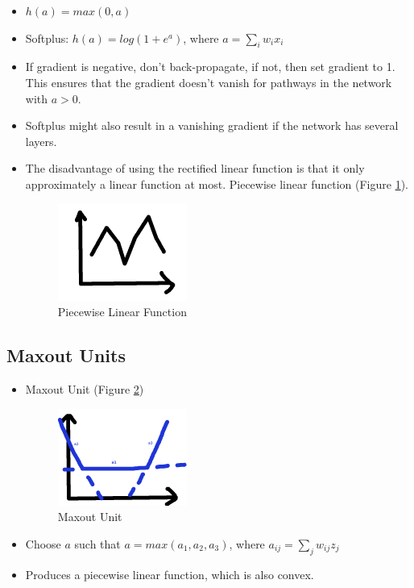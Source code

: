 \documentclass[parskip=half]{scrartcl}
\begin{document}
    \begin{itemize}
        \item 
        $h(a) = max(0, a) $
        \item 
        Softplus: $h(a) = log(1 + e^a) $, where $a = \sum_i w_i x_i $
        \item 
        If gradient is negative, don't back-propagate, if not, then set gradient to 1. This ensures that the gradient doesn't vanish for pathways in the network with $a > 0$.
        \item 
        Softplus might also result in a vanishing gradient if the network has several layers.
        \item 
        The disadvantage of using the rectified linear function is that it only approximately a linear function at most. Piecewise linear function (Figure \ref{fig:piecewise-linear-function}). 
        \begin{figure}[ht]
            \centering
            \includegraphics[width=0.4\textwidth]{piecewise-linear-function}
            \caption{Piecewise Linear Function}
            \label{fig:piecewise-linear-function}
        \end{figure}
    \end{itemize}


    \subsection{Maxout Units} %
    \label{sub:maxout_units}

        \begin{itemize}
            \item Maxout Unit (Figure \ref{fig:maxout-unit})
            \begin{figure}[ht]
                \centering
                \includegraphics[width=0.4\textwidth]{maxout-unit}
                \caption{Maxout Unit}
                \label{fig:maxout-unit}
            \end{figure}
            \item 
            Choose $a$ such that $a = max(a_1, a_2, a_3)$, where $a_{ij} = \sum_j w_{ij} z_j $
            \item 
            Produces a piecewise linear function, which is also convex.
        \end{itemize}
    
\end{document}
